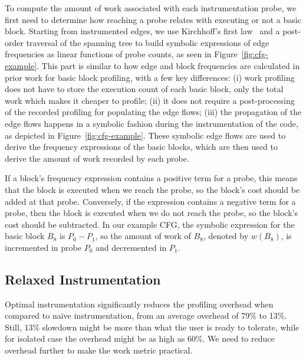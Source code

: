     To compute the amount of work associated with each instrumentation probe, we first need to determine how reaching a probe relates with
    executing or not a basic block. Starting from instrumented edges, we use Kirchhoff's first law~\cite{knuth73,ball94} and a post-order
    traversal of the spanning tree to build symbolic expressions of edge frequencies as linear functions of probe counts, as seen in
    Figure~\ref{fig:cfg-example}. This part is similar to how edge and block frequencies are calculated in prior work for basic block
    profiling, with a few key differences:
    (i)   work profiling does not have to store the execution count of each basic block, only the total work which makes it cheaper to profile;
    (ii)  it does not require a post-processing of the recorded profiling for populating the edge flows;
    (iii) the propagation of the edge flows happens in a symbolic fashion during the instrumentation of the code, as depicted in Figure~\ref{fig:cfg-example}.
    These symbolic edge flows are used to derive the frequency expressions of the basic blocks, which are then used to derive the amount of work
    recorded by each probe.


    If a block's frequency expression contains a positive term for a probe, this means that the block is executed when we reach the probe,
    so the block's cost should be added at that probe. Conversely, if the expression contains a negative term for a probe, then the block
    is executed when we do not reach the probe, so the block's cost should be subtracted. In our example CFG, the symbolic expression for
    the basic block $B_8$ is $P_0 - P_1$, so the amount of work of $B_8$, denoted by $w(B_8)$, is incremented in probe $P_0$ and
    decremented in $P_1$.


    \subsection{Relaxed Instrumentation}\label{subsec:relaxed}

    Optimal instrumentation significantly reduces the profiling overhead when compared to na\"ive instrumentation, from an average overhead
    of 79\% to 13\%. Still, 13\% slowdown might be more than what the user is ready to tolerate, while for isolated case the overhead might
    be as high as 60\%. We need to reduce overhead further to make the work metric practical.

